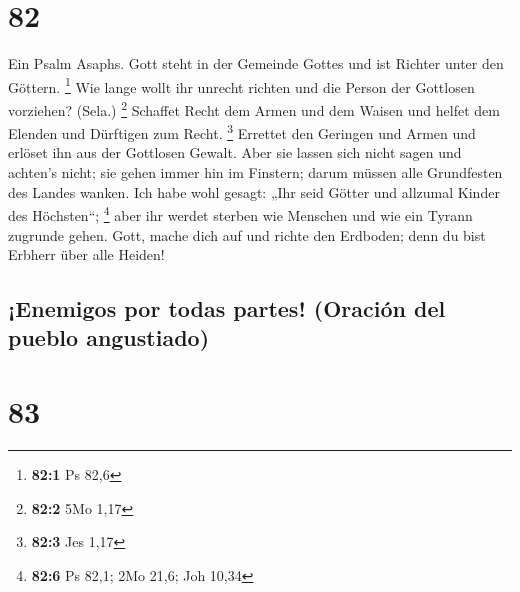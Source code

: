 \hypertarget{section-81}{%
\section{82}\label{section-81}}

 Ein Psalm Asaphs. Gott steht in der Gemeinde Gottes und
ist Richter unter den Göttern. \footnote{\textbf{82:1} Ps 82,6}
 Wie lange wollt ihr unrecht richten und die Person der
Gottlosen vorziehen? (Sela.) \footnote{\textbf{82:2} 5Mo 1,17}
 Schaffet Recht dem Armen und dem Waisen und helfet dem
Elenden und Dürftigen zum Recht. \footnote{\textbf{82:3} Jes 1,17}
 Errettet den Geringen und Armen und erlöset ihn aus der
Gottlosen Gewalt.  Aber sie lassen sich nicht sagen und
achten's nicht; sie gehen immer hin im Finstern; darum müssen alle
Grundfesten des Landes wanken.  Ich habe wohl gesagt: „Ihr
seid Götter und allzumal Kinder des Höchsten``; \footnote{\textbf{82:6}
  Ps 82,1; 2Mo 21,6; Joh 10,34}  aber ihr werdet sterben
wie Menschen und wie ein Tyrann zugrunde gehen.  Gott,
mache dich auf und richte den Erdboden; denn du bist Erbherr über alle
Heiden!

\hypertarget{enemigos-por-todas-partes-oraciuxf3n-del-pueblo-angustiado}{%
\subsection{¡Enemigos por todas partes! (Oración del pueblo
angustiado)}\label{enemigos-por-todas-partes-oraciuxf3n-del-pueblo-angustiado}}

\hypertarget{section-82}{%
\section{83}\label{section-82}}

